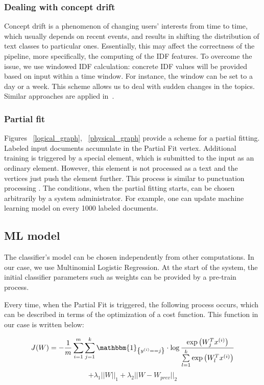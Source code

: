 \subsubsection{Dealing with concept drift}

Concept drift is a phenomenon of changing users' interests from time to time, which usually depends on recent events, and results in shifting the distribution of text classes to particular ones. Essentially, this may affect the correctness of the pipeline, more specifically, the computing of the IDF features. To overcome the issue, we use windowed IDF calculation: concrete IDF values will be provided based on input within a time window. For instance, the window can be set to a day or a week. This scheme allows us to deal with sudden changes in the topics. Similar approaches are applied in~\cite{klinkenberg2000detecting}.

\subsubsection{Partial fit}

Figures ~\ref{logical_graph}, ~\ref{physical_graph} provide a scheme for a partial fitting. Labeled input documents accumulate in the Partial Fit vertex. Additional training is triggered by a special element, which is submitted to the input as an ordinary element. However, this element is not processed as a text and the vertices just push the element further. This process is similar to punctuation processing \cite{tucker2003exploiting}. The conditions, when the partial fitting starts, can be chosen arbitrarily by a system administrator. For example, one can update machine learning model on every 1000 labeled documents.

\subsection{ML model \label{ML}}

The classifier's model can be chosen independently from other computations. In our case, we use Multinomial Logistic Regression. At the start of the system, the initial classifier parameters such as weights can be provided by a pre-train process.

Every time, when the Partial Fit is triggered, the following process occurs, which can be described in terms of the optimization of a cost function. This function in our case is written below:

\begin{center}

$$ J(W) = -\frac{1}{m} \sum \limits_{i = 1}^{m} \sum \limits_{j = 1}^{k} \mathbbm{1}_{\left\{y^{(i)} == j\right\}} \cdot \log \frac{\exp\left({W_{j}^Tx^{(i)}}\right) }{\sum \limits_{l = 1}^{k}  \exp\left({W_{l}^Tx^{(i)}}\right) }$$ 
 $$ +  \lambda_1 ||W||_1 + \lambda_2 ||W - W_{prev}||_2 $$

\end{center} 

